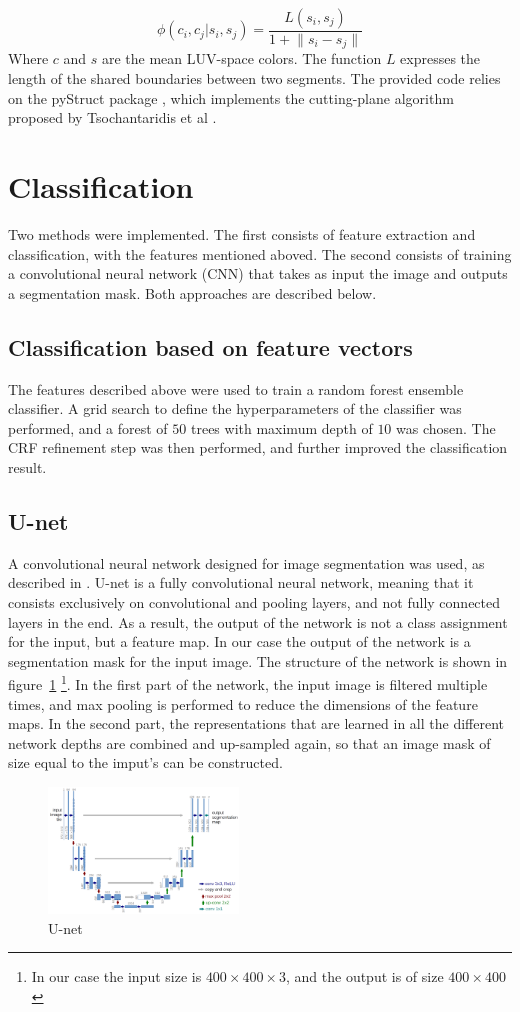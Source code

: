 \documentclass[10pt,conference,compsocconf]{IEEEtran}
\begin{document}
 \begin{equation}
\phi(c_i,c_j|s_i,s_j) = \frac{L(s_i,s_j)}{1+\lVert s_i - s_j \rVert}
 \end{equation}
Where \(c\) and \(s\) are the mean LUV-space colors. The function \(L\) expresses the length of the shared boundaries between two segments.
The provided code relies on the pyStruct package \cite{muller14}, which implements the cutting-plane algorithm proposed by Tsochantaridis et al \cite{tsochantaridis05}.
\section{Classification}
	Two methods were implemented. The first consists of feature extraction and classification, with the features mentioned aboved. The second consists of training a convolutional neural network (CNN) that takes as input the image and outputs a segmentation mask. Both approaches are described below. 	
	
	\subsection{Classification based on feature vectors}
	The features described above were used to train a random forest ensemble classifier. A grid search to define the hyperparameters of the classifier was performed, and a forest of $50$ trees with maximum depth of $10$ was chosen.
	The CRF refinement step was then performed, and further improved the classification result.
	\subsection{U-net}
	A convolutional neural network designed for image segmentation was used, as
  described in \cite{unet}. U-net is a fully convolutional neural network,
  meaning that it consists exclusively on convolutional and pooling layers, and
  not fully connected layers in the end. As a result, the output of the network
  is not a class assignment for the input, but a feature map. In our case the
  output of the network is a segmentation mask for the input image. The
  structure of the network is shown in figure~\ref{fig:unet_arch} \footnote{In our case the input size is $400 \times 400 \times 3$, and the output is of size $400 \times 400 $}. In the first part of the network, the input image is filtered multiple times, and max pooling is performed to reduce the dimensions of the feature maps. In the second part, the representations that are learned in all the different network depths are combined and up-sampled again, so that an image mask of size equal to the imput's can be constructed.
		\begin{figure}[!h]
			\centering
			\includegraphics[width=0.45\textwidth]{unet.png}
			\caption{U-net~\cite{unet}}
			\label{fig:unet_arch}
		\end{figure}
\end{document}
